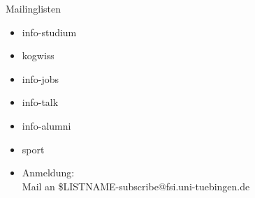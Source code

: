 \documentclass{beamer}
\begin{document}




	\begin{frame}[<+->]{Mailinglisten}
		\begin{itemize}
			\item info-studium
			\item kogwiss
			\item info-jobs
			\item info-talk
			\item info-alumni
            \item sport
			\item Anmeldung:\\
				Mail an \$LISTNAME-subscribe@fsi.uni-tuebingen.de
		\end{itemize}
	\end{frame}
\end{document}
